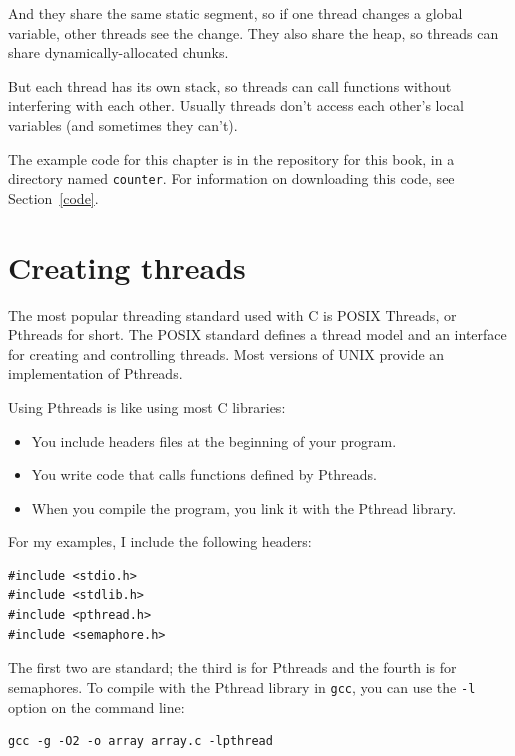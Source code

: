 \documentclass[12pt]{book}
\begin{document}
And they share the same static segment, so if one thread changes a
global variable, other threads see the change.  They also share the heap,
so threads can share dynamically-allocated chunks.

But each thread has its own stack, so threads can call functions without
interfering with each other.  Usually threads don't access each
other's local variables (and sometimes they can't).

The example code for this chapter is in the repository for this book,
in a directory named {\tt counter}.  For information on downloading
this code, see Section~\ref{code}.


\section{Creating threads}

The most popular threading standard used with C is POSIX Threads, or Pthreads for short.  The POSIX standard defines a thread model and an interface for creating and controlling threads.  Most versions of UNIX provide an implementation of Pthreads.

Using Pthreads is like using most C libraries:

\begin{itemize}

\item You include headers files at the beginning of your
program.

\item You write code that calls functions defined by Pthreads.

\item When you compile the program, you link it with the Pthread library.

\end{itemize}

For my examples, I include the following headers:

\begin{verbatim}
#include <stdio.h>
#include <stdlib.h>
#include <pthread.h>
#include <semaphore.h>
\end{verbatim}

The first two are standard; the third is for Pthreads and
the fourth is for semaphores.  To compile with the Pthread library in {\tt gcc}, you can use the {\tt -l} option on the command line:

\begin{verbatim}
gcc -g -O2 -o array array.c -lpthread
\end{verbatim}
\end{document}
